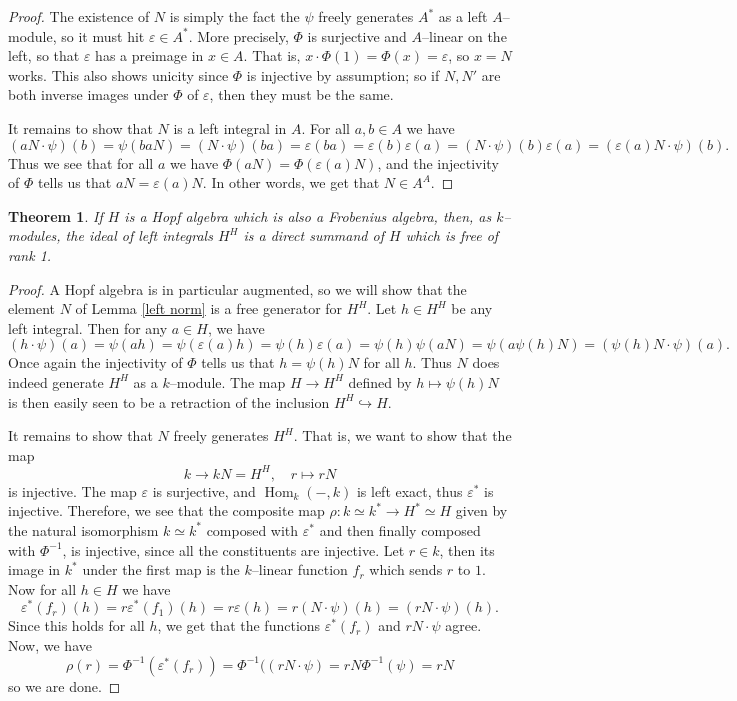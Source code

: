 \documentclass{article}
\theoremstyle{plain}
\newtheorem{Th}{Theorem}[section]
\theoremstyle{definition}
\DeclareMathOperator{\Hom}{Hom}
\begin{document}
\begin{proof}
    The existence of $N$ is simply the fact the $\psi$ freely generates $A^*$ as a left $A$--module, so it must hit $\varepsilon \in A^*$. More precisely, $\Phi$ is surjective and $A$--linear on the left, so that $\varepsilon$ has a preimage in $x\in A$. That is, $x\cdot \Phi(1) =\Phi(x)=\varepsilon$, so $x=N$ works. This also shows unicity since $\Phi$ is injective by assumption; so if $N, N'$ are both inverse images under $\Phi$ of $\varepsilon$, then they must be the same.

    It remains to show that $N$ is a left integral in $A$. For all $a, b\in A$ we have 
    \[
    (aN\cdot \psi)(b)=\psi(baN)=(N\cdot \psi)(ba)=\varepsilon(ba)=\varepsilon(b)\varepsilon(a)=(N\cdot \psi)(b)\varepsilon(a)=(\varepsilon(a)N\cdot \psi)(b).
    \]
    Thus we see that for all $a$ we have $\Phi(aN)=\Phi(\varepsilon(a)N)$, and the injectivity of $\Phi$ tells us that $aN=\varepsilon(a)N$. In other words, we get that $N\in A^A$.
\end{proof}



\begin{Th}
    If $H$ is a Hopf algebra which is also a Frobenius algebra, then, as $k$--modules, the ideal of left integrals $H^H$ is a direct summand of $H$ which is free of rank 1. 
\end{Th}

\begin{proof}
    A Hopf algebra is in particular augmented, so we will show that the element $N$ of Lemma \ref{left norm} is a free generator for $H^H$. Let $h\in H^H$ be any left integral. Then for any $a\in H$, we have 
    \[
    (h\cdot \psi)(a)=\psi(ah)=\psi(\varepsilon(a)h)=\psi(h)\varepsilon(a)=\psi(h)\psi(aN)=\psi(a\psi(h)N)=(\psi(h)N\cdot \psi)(a).
    \]
     Once again the injectivity of $\Phi$ tells us that $h=\psi(h)N$ for all $h$. Thus $N$ does indeed generate $H^H$ as a $k$--module. The map $H\to H^H$ defined by $h\mapsto \psi(h)N$ is then easily seen to be a retraction of the inclusion $H^H\hookrightarrow H$.

    It remains to show that $N$ freely generates $H^H$. That is, we want to show that the map
    \[
    k\to kN=H^H, \quad r\mapsto rN
    \]
      is injective. The map $\varepsilon$ is surjective, and $\Hom_k(-, k)$ is left exact, thus $\varepsilon^*$ is injective. Therefore, we see that the composite map $\rho: k\simeq k^* \to H^* \simeq H$ given by the natural isomorphism $k\simeq k^*$ composed with $\varepsilon^*$ and then finally composed with $\Phi^{-1}$, is injective, since all the constituents are injective. Let $r\in k$, then its image in $k^*$ under the first map is the $k$--linear function $f_r$ which sends $r$ to $1$. Now for all $h\in H$ we have 
      \[
      \varepsilon^*(f_r)(h)=r\varepsilon^*(f_1)(h)=r\varepsilon(h)=r(N\cdot \psi)(h)=(rN\cdot \psi)(h).
      \]
      Since this holds for all $h$, we get that the functions $\varepsilon^*(f_r)$ and $rN\cdot \psi$ agree. Now, we have 
      \[
      \rho(r)=\Phi^{-1}(\varepsilon^*(f_r))=\Phi^{-1}((rN\cdot \psi) = rN\Phi^{-1}(\psi) =rN
      \]
      so we are done.
\end{proof}
\end{document}
